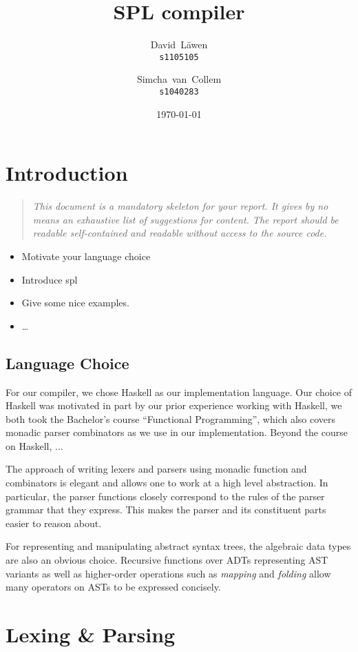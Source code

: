 \documentclass{report}
\author{%
	David~L\"awen\\
	\small\texttt{s1105105}\and
	Simcha~van~Collem\\
	\small\texttt{s1040283}
}
\date{\today}
\title{SPL compiler}
\begin{document}
\maketitle%

\tableofcontents%

\chapter{Introduction}
\begin{quote}
	\it
	This document is a mandatory skeleton for your report.
	It gives by no means an exhaustive list of suggestions for content.
	The report should be readable self-contained and readable without access to the source code.
\end{quote}
\begin{itemize}
	\item Motivate your language choice
	\item Introduce spl
	\item Give some nice examples.
	\item \ldots
\end{itemize}

\section{Language Choice}
For our compiler, we chose Haskell as our implementation language. Our choice
of Haskell was motivated in part by our prior experience working with Haskell,
we both took the Bachelor's course ``Functional Programming'', which also covers
monadic parser combinators as we use in our implementation.
Beyond the course on Haskell, ...

The approach of writing lexers and parsers using monadic function and
combinators is elegant and allows one to work at a high level abstraction.
In particular, the parser functions closely correspond to the rules of the
parser grammar that they express. This makes the parser and its constituent
parts easier to reason about.

For representing and manipulating abstract syntax trees, the algebraic data
types are also an obvious choice. Recursive functions over ADTs representing
AST variants as well as higher-order operations such as \emph{mapping} and
\emph{folding} allow many operators on ASTs to be expressed concisely.


\chapter{Lexing \& Parsing}

\end{document}
